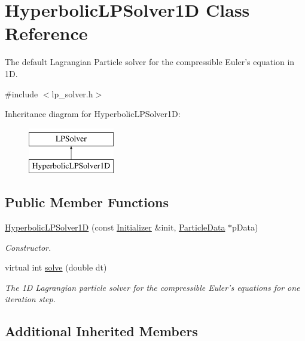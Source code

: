 \hypertarget{classHyperbolicLPSolver1D}{\section{Hyperbolic\-L\-P\-Solver1\-D Class Reference}
\label{classHyperbolicLPSolver1D}
}


The default Lagrangian Particle solver for the compressible Euler's equation in 1\-D.  




{\ttfamily \#include $<$lp\-\_\-solver.\-h$>$}

Inheritance diagram for Hyperbolic\-L\-P\-Solver1\-D\-:\begin{figure}[H]
\begin{center}
\leavevmode
\includegraphics[height=2.000000cm]{classHyperbolicLPSolver1D}
\end{center}
\end{figure}
\subsection*{Public Member Functions}
\begin{DoxyCompactItemize}
\item 
\hyperlink{classHyperbolicLPSolver1D_a33bf8dc24f0c3b88795898e509879ae8}{Hyperbolic\-L\-P\-Solver1\-D} (const \hyperlink{classInitializer}{Initializer} \&init, \hyperlink{classParticleData}{Particle\-Data} $\ast$p\-Data)
\begin{DoxyCompactList}\small\item\em Constructor. \end{DoxyCompactList}\item 
virtual int \hyperlink{classHyperbolicLPSolver1D_adeec127b2c0b1eee8670f45caa582bd7}{solve} (double dt)
\begin{DoxyCompactList}\small\item\em The 1\-D Lagrangian particle solver for the compressible Euler's equations for one iteration step. \end{DoxyCompactList}\end{DoxyCompactItemize}
\subsection*{Additional Inherited Members}


